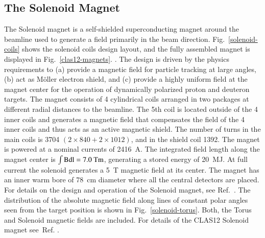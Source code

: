 \documentclass[final,3p,twocolumn]{elsarticle}
\begin{document}
\subsection{\rm The Solenoid Magnet}
The Solenoid magnet is a self-shielded superconducting magnet around the beamline used 
to generate a field primarily in the beam direction. Fig.~\ref{solenoid-coils} shows the solenoid coils design layout, 
and the fully assembled magnet is displayed in Fig.~\ref{clas12-magnets}.
. 
The design is driven by the physics requirements to (a) provide 
a magnetic field for particle tracking at large angles, (b) act as {\rm M\"oller} electron shield, and (c) provide 
a highly uniform field at the magnet center for the operation of dynamically polarized proton and deuteron targets.
The magnet consists of 4 cylindrical coils arranged in two packages at different radial distances to the beamline. 
The 5th coil is located outside of the 4 inner coils and generates a magnetic field that compensates the field 
of the 4 inner coils and thus acts as an active magnetic shield. The number of turns in the main coils is 
3704 $(2 \times 840 + 2 \times 1012)$, and in the shield coil 1392. The magnet is powered at a nominal currents of 2416~A. 
The integrated field length along the magnet center is $\rm \int Bdl = 7.0 \rm~Tm$, generating a stored energy of 20~MJ.  
At full current the solenoid generates a 5~T magnetic field at its center. The magnet has an inner warm bore of 78~cm diameter where all the 
 central detectors are placed.  For details on the design and operation of the Solenoid magnet, see Ref.~\cite{clas12-magnets}. The distribution of the absolute magnetic field along lines of constant polar angles seen from the target position is shown in Fig.~\ref{solenoid-torus}. Both, the Torus and Solenoid magnetic fields are included. For details of the CLAS12 Solenoid magnet see~Ref. \cite{clas12-magnets}. 
\end{document}
